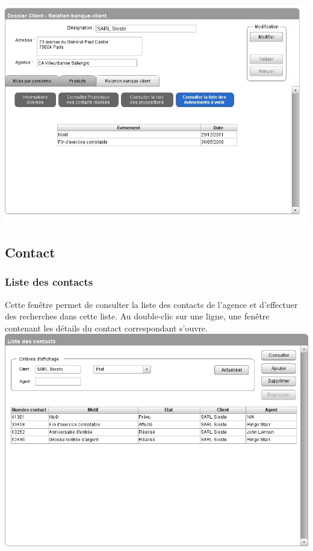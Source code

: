		\includegraphics[width=\linewidth]{IHM/IHMclient6.jpg} 
		
	\newpage
		
	\subsection{Contact}
	
		\subsubsection{Liste des contacts}
		Cette fenêtre permet de consulter la liste des contacts de l'agence et d'effectuer des recherches dans cette liste. Au double-clic sur une ligne, une fenêtre contenant les détails du contact correspondant s'ouvre. \\
		\includegraphics[width=\linewidth]{IHM/Liste_Contacts.png}
		
